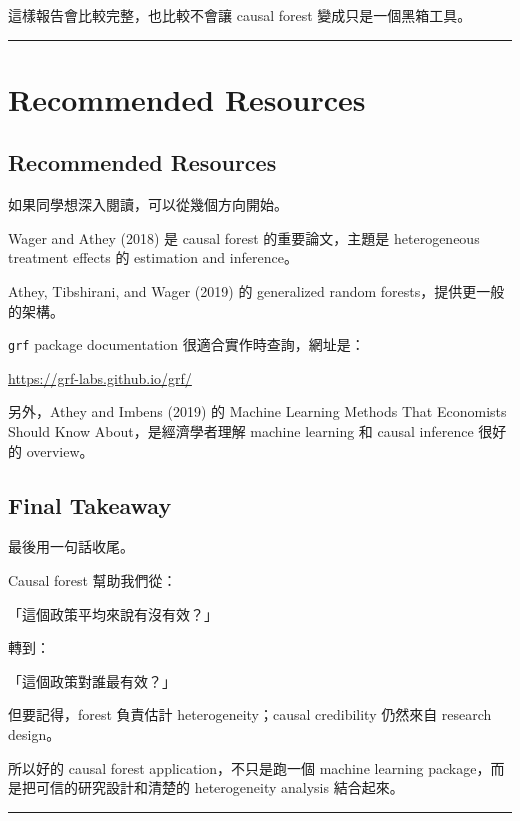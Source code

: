 \documentclass[
  chinese,
  11pt,
]{article}
\begin{document}
這樣報告會比較完整，也比較不會讓 causal forest 變成只是一個黑箱工具。

\begin{center}\rule{0.5\linewidth}{0.5pt}\end{center}

\section{Recommended Resources}\label{recommended-resources}

\subsection{Recommended Resources}\label{recommended-resources-1}

如果同學想深入閱讀，可以從幾個方向開始。

Wager and Athey (2018) 是 causal forest 的重要論文，主題是 heterogeneous
treatment effects 的 estimation and inference。

Athey, Tibshirani, and Wager (2019) 的 generalized random
forests，提供更一般的架構。

\texttt{grf} package documentation 很適合實作時查詢，網址是：

\url{https://grf-labs.github.io/grf/}

另外，Athey and Imbens (2019) 的 Machine Learning Methods That
Economists Should Know About，是經濟學者理解 machine learning 和 causal
inference 很好的 overview。

\subsection{Final Takeaway}\label{final-takeaway}

最後用一句話收尾。

Causal forest 幫助我們從：

「這個政策平均來說有沒有效？」

轉到：

「這個政策對誰最有效？」

但要記得，forest 負責估計 heterogeneity；causal credibility 仍然來自
research design。

所以好的 causal forest application，不只是跑一個 machine learning
package，而是把可信的研究設計和清楚的 heterogeneity analysis 結合起來。

\begin{center}\rule{0.5\linewidth}{0.5pt}\end{center}
\end{document}
